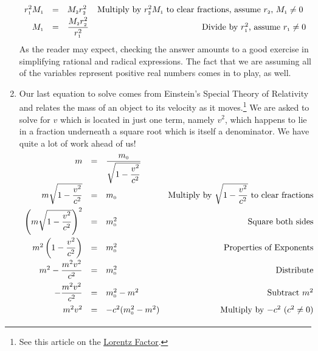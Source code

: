 \begin{ex}
\begin{enumerate}
\[\begin{array}{rclr}
r_{\text{\tiny$1$}}^2 M_{\text{\tiny$1$}} & = & M_{\text{\tiny$2$}}r_{\text{\tiny$2$}}^2 & \text{Multiply by $r_{\text{\tiny$2$}}^2 M_{\text{\tiny$1$}}$ to clear fractions, assume $r_{\text{\tiny$2$}}$,  $M_{\text{\tiny$1$}} \neq 0$ } \\[2pt]


M_{\text{\tiny$1$}} & = & \dfrac{M_{\text{\tiny$2$}}r_{\text{\tiny$2$}}^2}{r_{\text{\tiny$1$}}^2} & \text{Divide by $r_{\text{\tiny$1$}}^2$, assume $r_{\text{\tiny$1$}} \neq 0$} \\
\end{array} \] As the reader may expect, checking the answer amounts to a good exercise in simplifying rational and radical expressions.  The fact that we are assuming all of the variables represent positive real numbers comes in to play, as well.

\item  Our last equation to solve comes from Einstein's Special Theory of Relativity and relates the mass of an object to its velocity as it moves.\footnote{See this article on the \href{http://en.wikipedia.org/wiki/Lorentz_factor}{\underline{Lorentz Factor}}.} We are asked to solve for $v$ which is located in just one term, namely $v^2$, which happens to lie in a fraction underneath a square root which is itself a denominator. We have quite a lot of work ahead of us!\[ \begin{array}{rclr}

 m &  = & \dfrac{m_{\text{\tiny$0$}}}{\sqrt{1 - \dfrac{v^2}{c^2}}} & \\

m \sqrt{1 - \dfrac{v^2}{c^2}} & = & m_{\text{\tiny$0$}} & \text{Multiply by $\sqrt{1 - \dfrac{v^2}{c^2}}$ to clear fractions}\\ [8pt]

\left(m \sqrt{1 - \dfrac{v^2}{c^2}}\right)^{2} & = & m_{\text{\tiny$0$}}^{2} & \text{Square both sides}\\ [12pt]

m^2 \left(1 - \dfrac{v^2}{c^2}\right) & = &  m_{\text{\tiny$0$}}^{2} & \text{Properties of Exponents}\\[8pt]

m^2 - \dfrac{m^2 v^2}{c^2} & = & m_{\text{\tiny$0$}}^{2} & \text{Distribute} \\[8pt]

- \dfrac{m^2 v^2}{c^2} & = & m_{\text{\tiny$0$}}^{2} - m^2 & \text{Subtract $m^2$}  \\ [8pt]

m^2 v^2 & = & -c^2 (m_{\text{\tiny$0$}}^{2} - m^2)  & \text{Multiply by $-c^2$ ($c^2 \neq 0$)} \\ [2pt]


\end{array}\]
\end{enumerate}
\end{ex}
